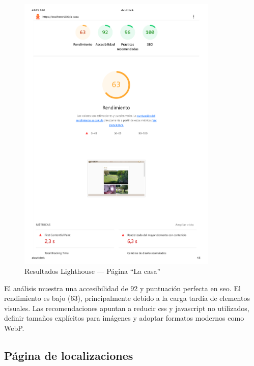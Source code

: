 \begin{figure}[h!tb]
  \centering
  \includegraphics[width=0.85\textwidth]{figs/la_casa_lighthouse.png}
  \caption{Resultados Lighthouse — Página “La casa”}
  \label{fig:lighthouse-la-casa}
\end{figure}

El análisis muestra una accesibilidad de 92 y puntuación perfecta en \gls{seo}. El rendimiento es bajo (63), principalmente debido a la carga tardía de elementos visuales. Las recomendaciones apuntan a reducir \gls{css} y \gls{javascript} no utilizados, definir tamaños explícitos para imágenes y adoptar formatos modernos como WebP.

\subsection*{Página de localizaciones}

